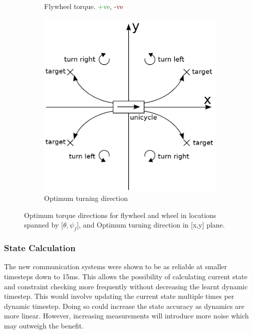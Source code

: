 \documentclass[twoside,twocolumn,12pt]{article}
\begin{document}
\begin{figure}[t]
\begin{subfigure}[t]{0.325\textwidth}
    \caption{Flywheel torque. \textcolor{ForestGreen}{+ve}, \textcolor{Maroon}{-ve}}
  \label{fig:fwt}
  \end{subfigure}
  \begin{subfigure}[t]{0.325\textwidth}
  \centering
    \includegraphics[width=\linewidth]{quadpos}
    \caption{Optimum turning direction \cite{roderigo}}
  \label{sub:pos}
  \end{subfigure}
  \caption{Optimum torque directions for flywheel and wheel in locations spanned by [$\theta ,\psi_f$], and Optimum turning direction in [x,y] plane.}
  \label{fig:quad}
\end{figure}

\subsubsection{State Calculation}
The new communication systems were shown to be as reliable at smaller timesteps down to 15ms. This allows the possibility of calculating current state and constraint checking more frequently without decreasing the learnt dynamic timestep.
\newline
This would involve updating the current state multiple times per dynamic timestep. Doing so could increase the state accuracy as dynamics are more linear. However, increasing measurements will introduce more noise which may outweigh the benefit. 
\end{document}
